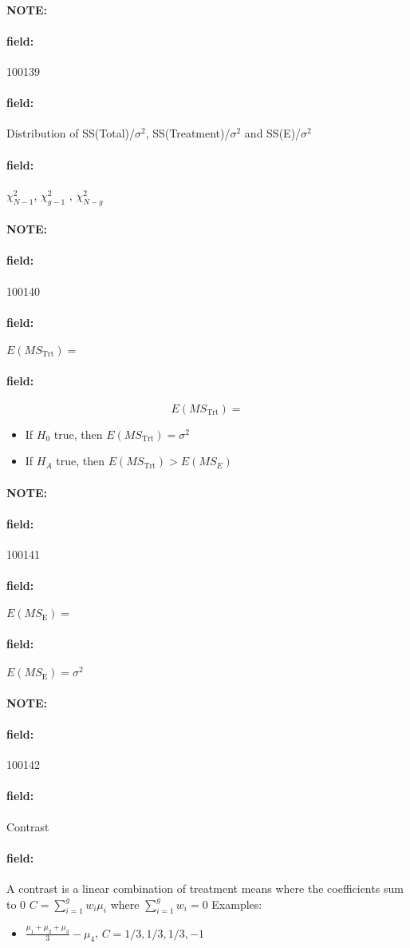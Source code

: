 \documentclass[12pt]{article}
\newenvironment{note}{\paragraph{NOTE:}}{}
\newenvironment{field}{\paragraph{field:}}{}
\begin{document}
\begin{note}
 \begin{field}
  \tiny 100139
 \end{field}
 \begin{field}
  Distribution of SS(Total)/$\sigma^2$, SS(Treatment)/$\sigma^2$ and SS(E)/$\sigma^2$
 \end{field}
 \begin{field}
  $\chi^2_{N-1}$, $\chi^2_{g-1}$ , $\chi^2_{N-g}$
 \end{field}
\end{note}

\begin{note}
 \begin{field}
  \tiny 100140
 \end{field}
 \begin{field}
  $E(MS_{\text{Trt}}) = $
 \end{field}
 \begin{field}
  $$E(MS_{\text{Trt}}) = $$
  \begin{itemize}
   \item If $H_0$ true, then $E(MS_{\text{Trt}}) = \sigma^2$
   \item If $H_A$ true, then $E(MS_{\text{Trt}})> E(MS_E)$
  \end{itemize}
 \end{field}
\end{note}

\begin{note}
 \begin{field}
  \tiny 100141
 \end{field}
 \begin{field}
  $E(MS_{\text{E}}) = $
 \end{field}
 \begin{field}
  $E(MS_{\text{E}}) = \sigma^2$
 \end{field}
\end{note}

\begin{note}
 \begin{field}
  \tiny 100142
 \end{field}
 \begin{field}
  Contrast
 \end{field}
 \begin{field}
  A contrast is a linear combination of treatment means where the coefficients sum to 0
  $C = \sum_{i=1}^g w_i \mu_i$ where $\sum_{i=1}^g w_i = 0$
  Examples:
  \begin{itemize}
   \item $\frac{\mu_1+\mu_2 +\mu_3 }{3} - \mu_4$, $C = 1/3,1/3,1/3,-1$
  \end{itemize}
 \end{field}
\end{note}
\end{document}
